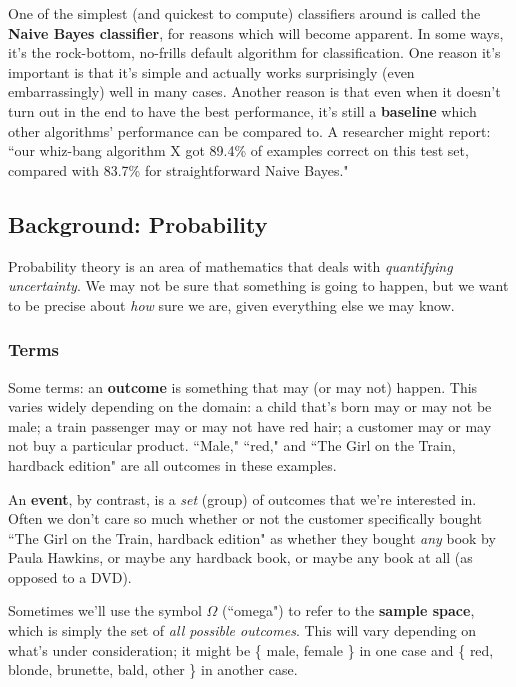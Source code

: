 \documentclass[12pt]{article}
\begin{document}
One of the simplest (and quickest to compute) classifiers around is called the
\textbf{Naive Bayes classifier}, for reasons which will become apparent. In
some ways, it's the rock-bottom, no-frills default algorithm for
classification. One reason it's important is that it's simple and actually
works surprisingly (even embarrassingly) well in many cases. Another reason is
that even when it doesn't turn out in the end to have the best performance,
it's still a \textbf{baseline} which other algorithms' performance can be
compared to. A researcher might report: ``our whiz-bang algorithm X got 89.4\%
of examples correct on this test set, compared with 83.7\% for straightforward
Naive Bayes."

\subsection{Background: Probability}

Probability theory is an area of mathematics that deals with
\textit{quantifying uncertainty}. We may not be sure that something is going
to happen, but we want to be precise about \textit{how} sure we are, given
everything else we may know.

\subsubsection{Terms}

Some terms: an \textbf{outcome} is something that may (or may not) happen.
This varies widely depending on the domain: a child that's born may or may not
be male; a train passenger may or may not have red hair; a customer may or may
not buy a particular product. ``Male," ``red," and ``The Girl on the Train,
hardback edition" are all outcomes in these examples.

An \textbf{event}, by contrast, is a \textit{set} (group) of outcomes that
we're interested in. Often we don't care so much whether or not the customer
specifically bought ``The Girl on the Train, hardback edition" as whether they
bought \textit{any} book by Paula Hawkins, or maybe any hardback book, or
maybe any book at all (as opposed to a DVD).

Sometimes we'll use the symbol $\Omega$ (``omega") to refer to the
\textbf{sample space}, which is simply the set of \textit{all possible
outcomes}. This will vary depending on what's under consideration; it might be
\{ male, female \} in one case and \{ red, blonde, brunette, bald, other \} in
another case.
\end{document}
